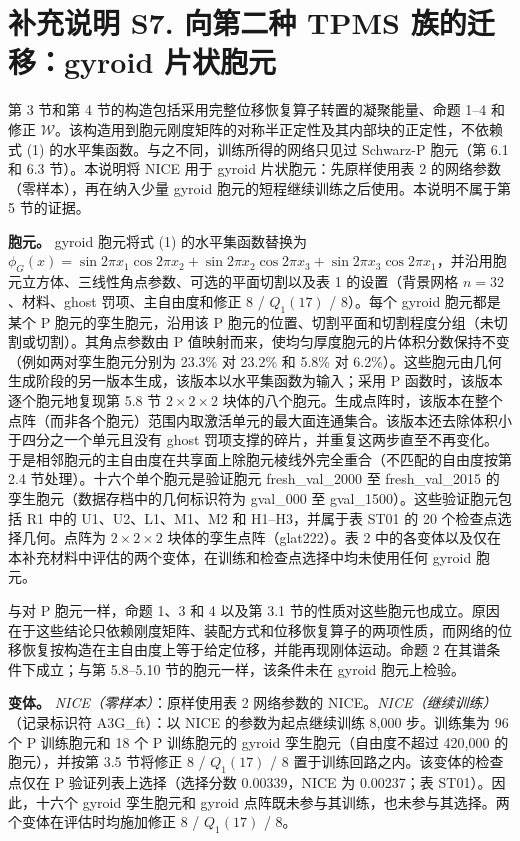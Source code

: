 \documentclass[preprint,12pt,authoryear]{elsarticle}
\begin{document}
\section{补充说明 S7. 向第二种 TPMS 族的迁移：gyroid 片状胞元}

第 3 节和第 4 节的构造包括采用完整位移恢复算子转置的凝聚能量、命题 1--4 和修正 \(\mathcal W\)。该构造用到胞元刚度矩阵的对称半正定性及其内部块的正定性，不依赖式 (1) 的水平集函数。与之不同，训练所得的网络只见过 Schwarz-P 胞元（第 6.1 和 6.3 节）。本说明将 NICE 用于 gyroid 片状胞元：先原样使用表 2 的网络参数（零样本），再在纳入少量 gyroid 胞元的短程继续训练之后使用。本说明不属于第 5 节的证据。

\textbf{胞元。} gyroid 胞元将式 (1) 的水平集函数替换为 \(\phi_G(x)=\sin2\pi x_1\cos2\pi x_2+\sin2\pi x_2\cos2\pi x_3+\sin2\pi x_3\cos2\pi x_1\)，并沿用胞元立方体、三线性角点参数、可选的平面切割以及表 1 的设置（背景网格 \(n=32\)、材料、ghost 罚项、主自由度和修正 8 / \(Q_1(17)\) / 8）。每个 gyroid 胞元都是某个 P 胞元的孪生胞元，沿用该 P 胞元的位置、切割平面和切割程度分组（未切割或切割）。其角点参数由 P 值映射而来，使均匀厚度胞元的片体积分数保持不变（例如两对孪生胞元分别为 23.3\% 对 23.2\% 和 5.8\% 对 6.2\%）。这些胞元由几何生成阶段的另一版本生成，该版本以水平集函数为输入；采用 P 函数时，该版本逐个胞元地复现第 5.8 节 \(2\times2\times2\) 块体的八个胞元。生成点阵时，该版本在整个点阵（而非各个胞元）范围内取激活单元的最大面连通集合。该版本还去除体积小于四分之一个单元且没有 ghost 罚项支撑的碎片，并重复这两步直至不再变化。于是相邻胞元的主自由度在共享面上除胞元棱线外完全重合（不匹配的自由度按第 2.4 节处理）。十六个单个胞元是验证胞元 fresh\_val\_2000 至 fresh\_val\_2015 的孪生胞元（数据存档中的几何标识符为 gval\_000 至 gval\_1500）。这些验证胞元包括 R1 中的 U1、U2、L1、M1、M2 和 H1--H3，并属于表 ST01 的 20 个检查点选择几何。点阵为 \(2\times2\times2\) 块体的孪生点阵（glat222）。表 2 中的各变体以及仅在本补充材料中评估的两个变体，在训练和检查点选择中均未使用任何 gyroid 胞元。

与对 P 胞元一样，命题 1、3 和 4 以及第 3.1 节的性质对这些胞元也成立。原因在于这些结论只依赖刚度矩阵、装配方式和位移恢复算子的两项性质，而网络的位移恢复按构造在主自由度上等于给定位移，并能再现刚体运动。命题 2 在其谱条件下成立；与第 5.8--5.10 节的胞元一样，该条件未在 gyroid 胞元上检验。

\textbf{变体。} \emph{NICE（零样本）}：原样使用表 2 网络参数的 NICE。\emph{NICE（继续训练）}（记录标识符 A3G\_ft）：以 NICE 的参数为起点继续训练 8,000 步。训练集为 96 个 P 训练胞元和 18 个 P 训练胞元的 gyroid 孪生胞元（自由度不超过 420,000 的胞元），并按第 3.5 节将修正 8 / \(Q_1(17)\) / 8 置于训练回路之内。该变体的检查点仅在 P 验证列表上选择（选择分数 0.00339，NICE 为 0.00237；表 ST01）。因此，十六个 gyroid 孪生胞元和 gyroid 点阵既未参与其训练，也未参与其选择。两个变体在评估时均施加修正 8 / \(Q_1(17)\) / 8。
\end{document}

